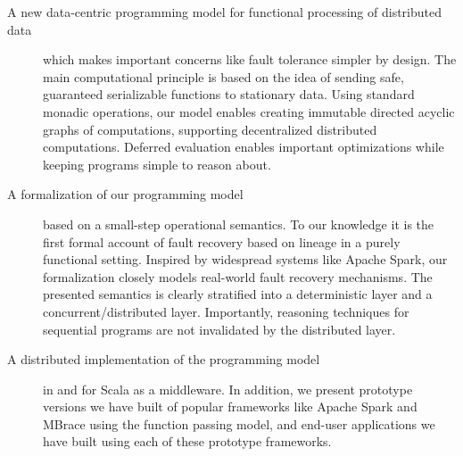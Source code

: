 \documentclass{jfp1}
\newcommand{\fixme}[1]{{\color{gray}\itshape#1}}
\begin{document}
\begin{description}

  \item[A new data-centric programming model for functional processing of
    distributed data] which makes important concerns like fault tolerance
    simpler by design. The main computational principle is based on the idea of
    sending safe, guaranteed serializable functions to stationary data. Using
    standard monadic operations, our model enables creating immutable directed
    acyclic graphs of computations, supporting decentralized distributed
    computations. Deferred evaluation enables important optimizations while
    keeping programs simple to reason about.

  \item[A formalization of our programming model] based on a small-step
    operational  semantics. To our knowledge it is the first formal account of
    fault recovery based on lineage in a purely functional setting. Inspired by
    widespread systems like Apache Spark, our formalization closely models
    real-world fault recovery mechanisms. The presented semantics is clearly
    stratified into a deterministic layer and a concurrent/distributed layer.
    Importantly, reasoning techniques for sequential programs are not
    invalidated by the distributed layer.

  \item[A distributed implementation of the programming model] in and for Scala
    as a middleware. In addition, we present prototype versions we have built of
    popular frameworks like Apache Spark and MBrace using the function passing
    model, and end-user applications we have built using each of these prototype
    frameworks.



\end{description}
\end{document}
